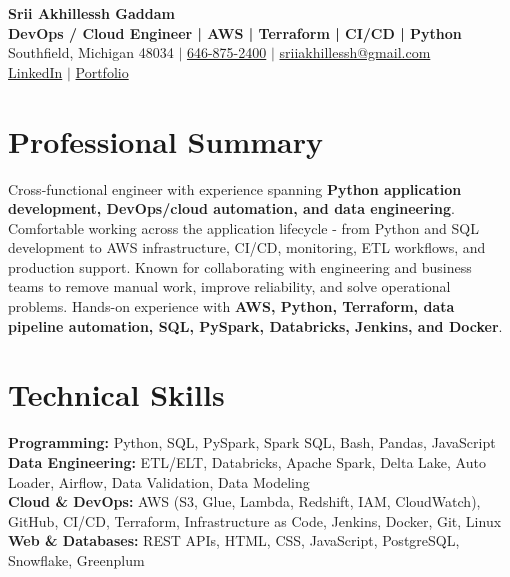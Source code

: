 \documentclass[letterpaper,10pt]{article}
\begin{document}
\fontsize{9.35pt}{10.45pt}\selectfont

\begin{center}
    {\LARGE \textbf{Srii Akhillessh Gaddam}} \\[-1pt]
    \textbf{DevOps / Cloud Engineer | AWS | Terraform | CI/CD | Python} \\[2pt]
    Southfield, Michigan 48034 $|$
    \href{tel:6468752400}{646-875-2400} $|$
    \href{mailto:sriiakhillessh@gmail.com}{sriiakhillessh@gmail.com} \\[1pt]
    \href{https://www.linkedin.com/in/srii-akhiilessh-gaddam-b48668191/}{LinkedIn} $|$
    \href{https://sriiakhillesshg.github.io/portfolio/}{Portfolio}
\end{center}
\vspace{-8pt}

\section{Professional Summary}
\small{Cross-functional engineer with experience spanning \textbf{Python application development, DevOps/cloud automation, and data engineering}. Comfortable working across the application lifecycle - from Python and SQL development to AWS infrastructure, CI/CD, monitoring, ETL workflows, and production support. Known for collaborating with engineering and business teams to remove manual work, improve reliability, and solve operational problems. Hands-on experience with \textbf{AWS, Python, Terraform, data pipeline automation, SQL, PySpark, Databricks, Jenkins, and Docker}.}

\section{Technical Skills}
\small{
\textbf{Programming:} Python, SQL, PySpark, Spark SQL, Bash, Pandas, JavaScript \\
\textbf{Data Engineering:} ETL/ELT, Databricks, Apache Spark, Delta Lake, Auto Loader, Airflow, Data Validation, Data Modeling \\
\textbf{Cloud \& DevOps:} AWS (S3, Glue, Lambda, Redshift, IAM, CloudWatch), GitHub, CI/CD, Terraform, Infrastructure as Code, Jenkins, Docker, Git, Linux \\
\textbf{Web \& Databases:} REST APIs, HTML, CSS, JavaScript, PostgreSQL, Snowflake, Greenplum
}
\end{document}
